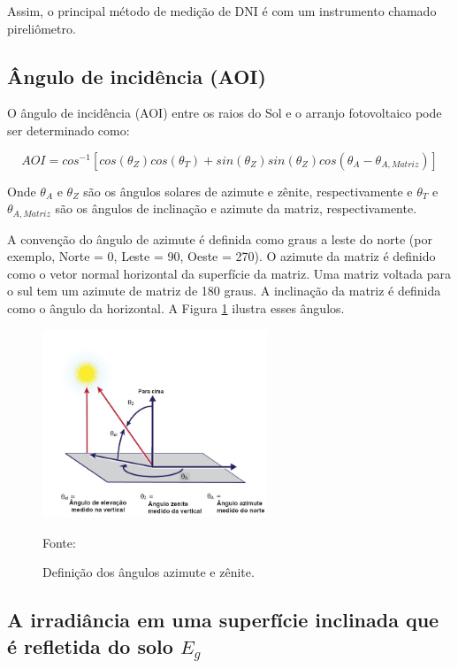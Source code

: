 Assim, o principal método de medição de DNI é com um instrumento chamado pireliômetro.

\subsection{Ângulo de incidência (AOI)}

O ângulo de incidência (AOI) entre os raios do Sol e o arranjo fotovoltaico pode ser determinado como:

\begin{equation}
    AOI = cos^{-1}[cos(\theta_Z)cos(\theta_T) + sin(\theta_Z)sin(\theta_Z)cos(\theta_A - \theta_{A,Matriz})]
    \label{eq:aoi}
\end{equation}

Onde $\theta_A$ e $\theta_Z$ são os ângulos solares de azimute e zênite, respectivamente e $\theta_T$ e $\theta_{A,Matriz}$ são os ângulos de inclinação e azimute da matriz, respectivamente.

A convenção do ângulo de azimute é definida como graus a leste do norte (por exemplo, Norte = 0, Leste = 90, Oeste = 270). O azimute da matriz é definido como o vetor normal horizontal da superfície da matriz. Uma matriz voltada para o sul tem um azimute de matriz de 180 graus. A inclinação da matriz é definida como o ângulo da horizontal. A Figura \ref{fig:sun_position} ilustra esses ângulos.

\begin{figure}[H]
    \centering
    \includegraphics[width=0.6\textwidth]{./Figuras/sun_position.png}
    \caption{Definição dos ângulos azimute e zênite.}{Fonte: \cite{sandia}}
   \label{fig:sun_position}
\end{figure}

\subsection{A irradiância em uma superfície inclinada que é refletida do solo $E_g$}

